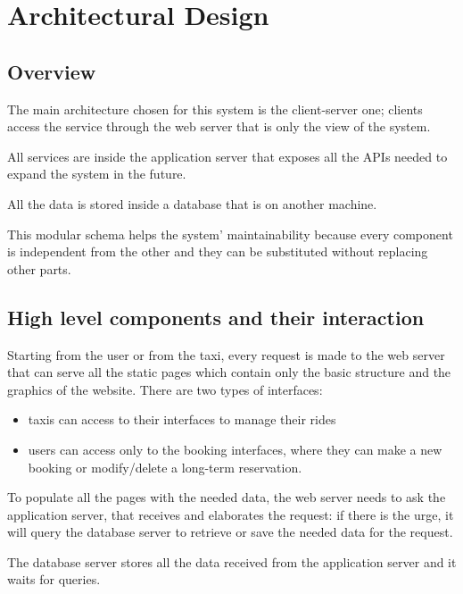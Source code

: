 \section{Architectural Design}
\subsection{Overview}
	The main architecture chosen for this system is the client-server one; clients access the service through the web server that is only the view of the system. 
	
	All services are inside the application server that exposes all the APIs needed to expand the system in the future.
	
	All the data is stored inside a database that is on another machine.

	This modular schema helps the system' maintainability because every component is independent from the other and they can be substituted without replacing other parts. 
\subsection{High level components and their interaction}
	Starting from the user or from the taxi, every request is made to the web server that can serve all the static pages which contain only the basic structure and the graphics of the website. There are two types of interfaces:
	\begin{itemize} 
		\item taxis can access to their interfaces to manage their rides 
		\item users can access only to the booking interfaces, where they can make a new booking or modify/delete a long-term reservation.
	\end{itemize}
	To populate all the pages with the needed data, the web server needs to ask the application server, that receives and elaborates the request: if there is the urge, it will query the database server to retrieve or save the needed data for the request.
	
	The database server stores all the data received from the application server and it waits for queries.

